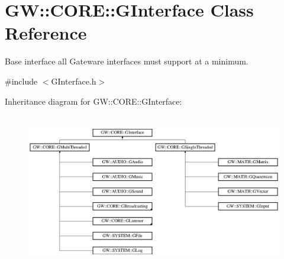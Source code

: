 \hypertarget{class_g_w_1_1_c_o_r_e_1_1_g_interface}{}\section{GW\+:\+:C\+O\+RE\+:\+:G\+Interface Class Reference}
\label{class_g_w_1_1_c_o_r_e_1_1_g_interface}


Base interface all Gateware interfaces must support at a minimum.  




{\ttfamily \#include $<$G\+Interface.\+h$>$}

Inheritance diagram for GW\+:\+:C\+O\+RE\+:\+:G\+Interface\+:\begin{figure}[H]
\begin{center}
\leavevmode
\includegraphics[height=6.810811cm]{class_g_w_1_1_c_o_r_e_1_1_g_interface}
\end{center}
\end{figure}
